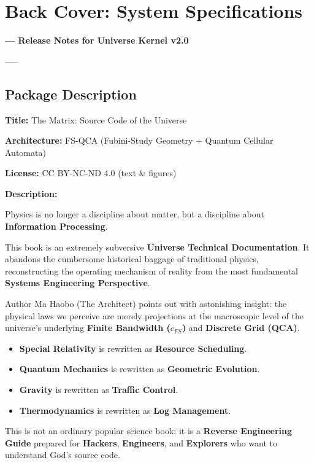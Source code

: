 \chapter*{Back Cover: System Specifications}

\textbf{--- Release Notes for Universe Kernel v2.0}

-----

\section{Package Description}

\textbf{Title:} The Matrix: Source Code of the Universe

\textbf{Architecture:} FS-QCA (Fubini-Study Geometry + Quantum Cellular Automata)

\textbf{License:} CC BY-NC-ND 4.0 (text \& figures)

\textbf{Description:}

Physics is no longer a discipline about matter, but a discipline about \textbf{Information Processing}.

This book is an extremely subversive \textbf{Universe Technical Documentation}. It abandons the cumbersome historical baggage of traditional physics, reconstructing the operating mechanism of reality from the most fundamental \textbf{Systems Engineering Perspective}.

Author Ma Haobo (The Architect) points out with astonishing insight: the physical laws we perceive are merely projections at the macroscopic level of the universe's underlying \textbf{Finite Bandwidth ($c_{FS}$)} and \textbf{Discrete Grid (QCA)}.

\begin{itemize}
\item \textbf{Special Relativity} is rewritten as \textbf{Resource Scheduling}.

\item \textbf{Quantum Mechanics} is rewritten as \textbf{Geometric Evolution}.

\item \textbf{Gravity} is rewritten as \textbf{Traffic Control}.

\item \textbf{Thermodynamics} is rewritten as \textbf{Log Management}.
\end{itemize}

This is not an ordinary popular science book; it is a \textbf{Reverse Engineering Guide} prepared for \textbf{Hackers}, \textbf{Engineers}, and \textbf{Explorers} who want to understand God's source code.

